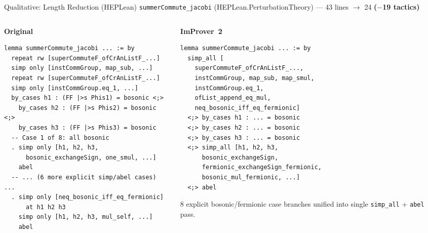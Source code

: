 \documentclass{beamer}
\newcommand{\good}[1]{\textcolor{improverGreen}{\textbf{#1}}}
\begin{document}
\begin{frame}[fragile]{Qualitative: Length Reduction (HEPLean)}
\vspace{0.2em}
{\small \texttt{summerCommute\_jacobi} (HEPLean.PerturbationTheory) --- 43 lines $\to$ 24 \good{($-$19 tactics)}}
\begin{columns}[T]
\begin{column}{0.54\textwidth}
\textbf{Original}
\begin{lstlisting}[basicstyle=\tiny\ttfamily]
lemma summerCommute_jacobi ... := by
  repeat rw [superCommuteF_ofCrAnListF_...]
  simp only [instCommGroup, map_sub, ...]
  repeat rw [superCommuteF_ofCrAnListF_...]
  simp only [instCommGroup.eq_1, ...]
  by_cases h1 : (FF |>s Phis1) = bosonic <;>
    by_cases h2 : (FF |>s Phis2) = bosonic <;>
    by_cases h3 : (FF |>s Phis3) = bosonic
  -- Case 1 of 8: all bosonic
  . simp only [h1, h2, h3,
      bosonic_exchangeSign, one_smul, ...]
    abel
  -- ... (6 more explicit simp/abel cases) ...
  . simp only [neq_bosonic_iff_eq_fermionic]
      at h1 h2 h3
    simp only [h1, h2, h3, mul_self, ...]
    abel
\end{lstlisting}
\end{column}
\begin{column}{0.42\textwidth}
\textbf{ImProver~2}
\begin{lstlisting}[basicstyle=\tiny\ttfamily]
lemma summerCommute_jacobi ... := by
  simp_all [
    superCommuteF_ofCrAnListF_...,
    instCommGroup, map_sub, map_smul,
    instCommGroup.eq_1,
    ofList_append_eq_mul,
    neq_bosonic_iff_eq_fermionic]
  <;> by_cases h1 : ... = bosonic
  <;> by_cases h2 : ... = bosonic
  <;> by_cases h3 : ... = bosonic
  <;> simp_all [h1, h2, h3,
      bosonic_exchangeSign,
      fermionic_exchangeSign_fermionic,
      bosonic_mul_fermionic, ...]
  <;> abel
\end{lstlisting}
\vspace{0.3em}
\small 8 explicit bosonic/fermionic case branches unified into single \texttt{simp\_all} + \texttt{abel} pass.
\end{column}
\end{columns}
\end{frame}
\end{document}
